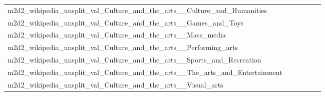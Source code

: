{\begin{longtable}{m{6cm}m{1.7cm}m{1.7cm}m{1.7cm}m{1.7cm}m{1.7cm}}
	m2d2\_wikipedia\_unsplit\_val\_Culture\_and\_the\_arts\_\_Culture\_and\_Humanities  & \colorbox[HTML]{fdfedf}{\makebox[\mywidth][c]{12.13}} & \colorbox[HTML]{edf8b2}{\makebox[\mywidth][c]{11.74}} & \colorbox[HTML]{ffffe5}{\makebox[\mywidth][c]{12.82}} & \colorbox[HTML]{d0ec9e}{\makebox[\mywidth][c]{11.63}} & \colorbox[HTML]{77c578}{\makebox[\mywidth][c]{11.48}}\\
	m2d2\_wikipedia\_unsplit\_val\_Culture\_and\_the\_arts\_\_Games\_and\_Toys  & \colorbox[HTML]{f9fdc9}{\makebox[\mywidth][c]{14.06}} & \colorbox[HTML]{e8f6ae}{\makebox[\mywidth][c]{13.86}} & \colorbox[HTML]{ffffe5}{\makebox[\mywidth][c]{15.17}} & \colorbox[HTML]{daf0a4}{\makebox[\mywidth][c]{13.79}} & \colorbox[HTML]{77c578}{\makebox[\mywidth][c]{13.57}}\\
	m2d2\_wikipedia\_unsplit\_val\_Culture\_and\_the\_arts\_\_Mass\_media  & \colorbox[HTML]{fefee0}{\makebox[\mywidth][c]{12.16}} & \colorbox[HTML]{eff8b3}{\makebox[\mywidth][c]{11.80}} & \colorbox[HTML]{ffffe5}{\makebox[\mywidth][c]{12.74}} & \colorbox[HTML]{eef8b2}{\makebox[\mywidth][c]{11.79}} & \colorbox[HTML]{77c578}{\makebox[\mywidth][c]{11.55}}\\
	m2d2\_wikipedia\_unsplit\_val\_Culture\_and\_the\_arts\_\_Performing\_arts  & \colorbox[HTML]{ffffe5}{\makebox[\mywidth][c]{11.75}} & \colorbox[HTML]{f2fab5}{\makebox[\mywidth][c]{11.25}} & \colorbox[HTML]{ffffe5}{\makebox[\mywidth][c]{12.03}} & \colorbox[HTML]{daf0a4}{\makebox[\mywidth][c]{11.17}} & \colorbox[HTML]{77c578}{\makebox[\mywidth][c]{11.03}}\\
	m2d2\_wikipedia\_unsplit\_val\_Culture\_and\_the\_arts\_\_Sports\_and\_Recreation  & \colorbox[HTML]{fefee3}{\makebox[\mywidth][c]{10.01}} & \colorbox[HTML]{d1ec9f}{\makebox[\mywidth][c]{9.63}} & \colorbox[HTML]{ffffe5}{\makebox[\mywidth][c]{10.36}} & \colorbox[HTML]{a5d98b}{\makebox[\mywidth][c]{9.58}} & \colorbox[HTML]{77c578}{\makebox[\mywidth][c]{9.54}}\\
	m2d2\_wikipedia\_unsplit\_val\_Culture\_and\_the\_arts\_\_The\_arts\_and\_Entertainment  & \colorbox[HTML]{fdfedb}{\makebox[\mywidth][c]{12.13}} & \colorbox[HTML]{f1f9b4}{\makebox[\mywidth][c]{11.85}} & \colorbox[HTML]{ffffe5}{\makebox[\mywidth][c]{12.83}} & \colorbox[HTML]{d5eea1}{\makebox[\mywidth][c]{11.73}} & \colorbox[HTML]{77c578}{\makebox[\mywidth][c]{11.58}}\\
	m2d2\_wikipedia\_unsplit\_val\_Culture\_and\_the\_arts\_\_Visual\_arts  & \colorbox[HTML]{fcfed9}{\makebox[\mywidth][c]{12.36}} & \colorbox[HTML]{eaf7af}{\makebox[\mywidth][c]{12.09}} & \colorbox[HTML]{ffffe5}{\makebox[\mywidth][c]{13.05}} & \colorbox[HTML]{c9e99b}{\makebox[\mywidth][c]{11.99}} & \colorbox[HTML]{77c578}{\makebox[\mywidth][c]{11.87}}\\

\end{longtable}}
